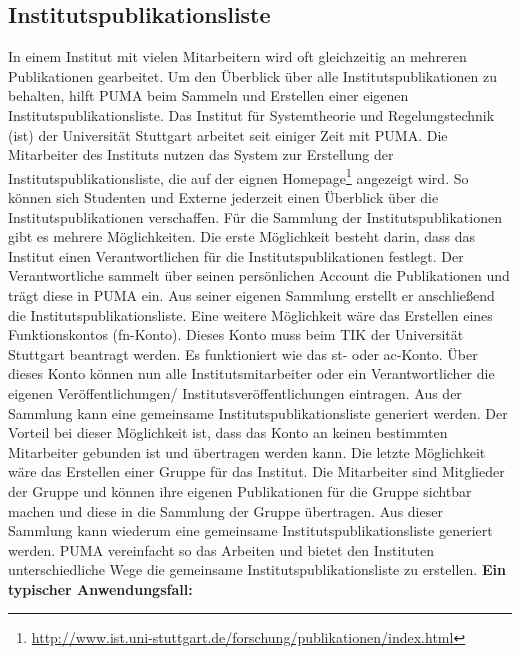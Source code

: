 \subsection{Institutspublikationsliste}
In einem Institut mit vielen Mitarbeitern wird oft gleichzeitig an mehreren Publikationen gearbeitet. Um den Überblick über alle Institutspublikationen zu behalten, hilft PUMA beim Sammeln und Erstellen einer eigenen Institutspublikationsliste. \newline
Das Institut für Systemtheorie und Regelungstechnik (ist) der Universität Stuttgart arbeitet seit einiger Zeit mit PUMA. Die Mitarbeiter des Instituts nutzen das System zur Erstellung der Institutspublikationsliste, die auf der eignen Homepage\footnote{\url{http://www.ist.uni-stuttgart.de/forschung/publikationen/index.html}} angezeigt wird. So können sich Studenten und Externe jederzeit einen Überblick über die Institutspublikationen verschaffen.\newline
Für die Sammlung der Institutspublikationen gibt es mehrere Möglichkeiten. Die erste Möglichkeit besteht darin, dass das Institut einen Verantwortlichen für  die Institutspublikationen festlegt. Der Verantwortliche sammelt über seinen persönlichen Account die Publikationen und trägt diese in PUMA ein. Aus seiner eigenen Sammlung erstellt er anschließend die Institutspublikationsliste. Eine weitere Möglichkeit wäre das Erstellen eines Funktionskontos (fn-Konto). Dieses Konto muss beim TIK der Universität Stuttgart beantragt werden. Es funktioniert wie das st- oder ac-Konto. Über dieses Konto können nun alle Institutsmitarbeiter oder ein Verantwortlicher die eigenen Veröffentlichungen/ Institutsveröffentlichungen eintragen. Aus der Sammlung kann eine gemeinsame Institutspublikationsliste generiert werden. Der Vorteil bei dieser Möglichkeit ist, dass das Konto an keinen bestimmten Mitarbeiter gebunden ist und übertragen werden kann. Die letzte Möglichkeit wäre das Erstellen einer Gruppe für das Institut. Die Mitarbeiter sind Mitglieder der Gruppe und können ihre eigenen Publikationen für die Gruppe sichtbar machen und diese in die Sammlung der Gruppe übertragen. Aus dieser  Sammlung kann wiederum eine gemeinsame Institutspublikationsliste generiert werden.\newline
PUMA vereinfacht so das Arbeiten und bietet den Instituten unterschiedliche Wege die gemeinsame Institutspublikationsliste zu erstellen.
\newline \newline
\textbf{Ein typischer Anwendungsfall:}\newline
